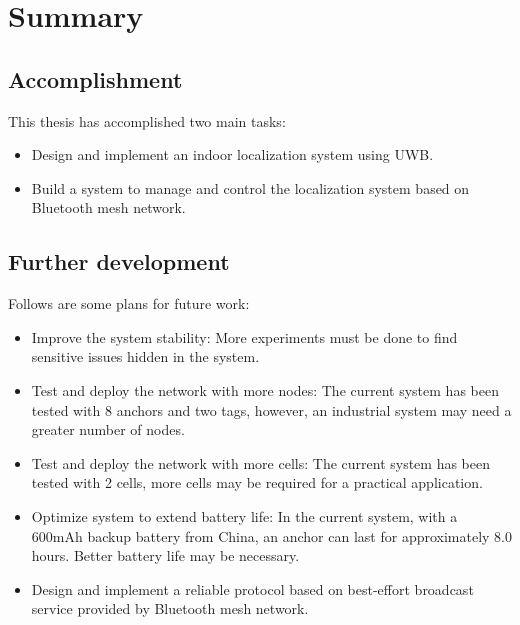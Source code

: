 \documentclass[\main/main.tex]{subfiles}
\begin{document}
\graphicspath{{img/}{summary/img/}}

\chapter{Summary}

\section{Accomplishment}
This thesis has accomplished two main tasks:
\begin{itemize}
    \item Design and implement an indoor localization system using UWB.
    \item Build a system to manage and control the localization system based on Bluetooth mesh network.
\end{itemize}

\section{Further development}
Follows are some plans for future work:
\begin{itemize}
    \item Improve the system stability: More experiments must be done to find sensitive issues hidden in the system.
    \item Test and deploy the network with more nodes: The current system has been tested with 8 anchors and two tags, however, an industrial system may need a greater number of nodes.
    \item Test and deploy the network with more cells: The current system has been tested with 2 cells, more cells may be required for a practical application.
    \item Optimize system to extend battery life: In the current system, with a 600mAh backup battery from China, an anchor can last for approximately 8.0 hours. Better battery life may be necessary.
    \item Design and implement a reliable protocol based on best-effort broadcast service provided by Bluetooth mesh network.
\end{itemize}
\end{document}
